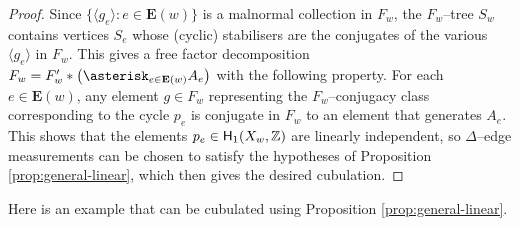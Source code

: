 \documentclass[11pt,oneside]{amsart}
\newcounter{ax}
\theoremstyle{definition}
\newcommand{\homology}{\ensuremath{{\sf{H}}}}
\newcommand{\field}[1]{\mathbb{#1}}
\newcommand{\integers}{\ensuremath{\field{Z}}}
\begin{document}
\begin{proof}

Since $\{\langle g_e\rangle:e\in\mathbf E(w)\}$ is a malnormal collection in $F_w$, the $F_w$--tree $S_w$ contains vertices $S_e$ whose (cyclic) stabilisers are the conjugates of the various $\langle g_e\rangle$ in $F_w$.
This gives a free factor decomposition $F_w=F_w'*\left(\asterisk_{e\in \mathbf E(w)}A_e\right)$ with the following property.  For each $e\in\mathbf E(w)$, any element $g\in F_w$ representing the $F_w$--conjugacy class corresponding to the cycle $p_e$ is conjugate in $F_w$ to an element that generates $A_e$. This shows that the elements $p_e\in \homology_1(X_w,\integers)$ are linearly independent, so $\Delta$--edge measurements can be chosen to satisfy the hypotheses of Proposition \ref{prop:general-linear}, which then gives the desired cubulation.
\end{proof}

Here is an example that can be cubulated using Proposition \ref{prop:general-linear}.  
\end{document}
